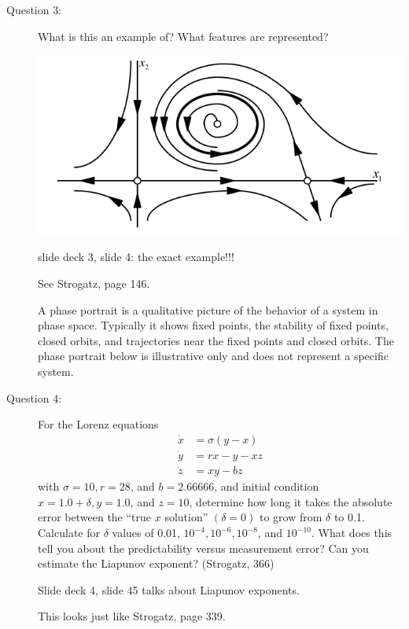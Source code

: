 \documentclass[letterpaper,10pt]{article}
\begin{document}
\begin{description}

\item[Question 3:]
What is this an example of?  What features are represented?
\begin{center}
  \includegraphics[scale=0.65]{images/phaseportrait.png}
\end{center}

slide deck 3, slide 4: the exact example!!!

See Strogatz, page 146.

A phase portrait is a qualitative picture of the behavior of a system in phase space.  Typically it shows fixed points, the stability of fixed points, closed orbits, and trajectories near the fixed points and closed orbits.  The phase portrait below is illustrative only and does not represent a specific system.


\item[Question 4:]
For the Lorenz equations
\begin{align*}
\dot{x} &= \sigma(y-x) \\
\dot{y} &= rx-y-xz \\
\dot{z} &= xy-bz
\end{align*}
with $\sigma=10, r=28$, and $b=2.66666$, and initial condition $x=1.0+\delta, y=1.0$, and $z=10$, determine how long it takes the absolute error between the ``true $x$ solution'' $(\delta=0)$ to grow from $\delta$ to 0.1. Calculate for $\delta$ values of 0.01, $10^{-4}, 10^{-6}, 10^{-8}$, and $10^{-10}$.  What does this tell you about the predictability versus measurement error?  Can you estimate the Liapunov exponent? (Strogatz, 366)

Slide deck 4, slide 45 talks about Liapunov exponents.

This looks just like Strogatz, page 339.


\end{description}
\end{document}
